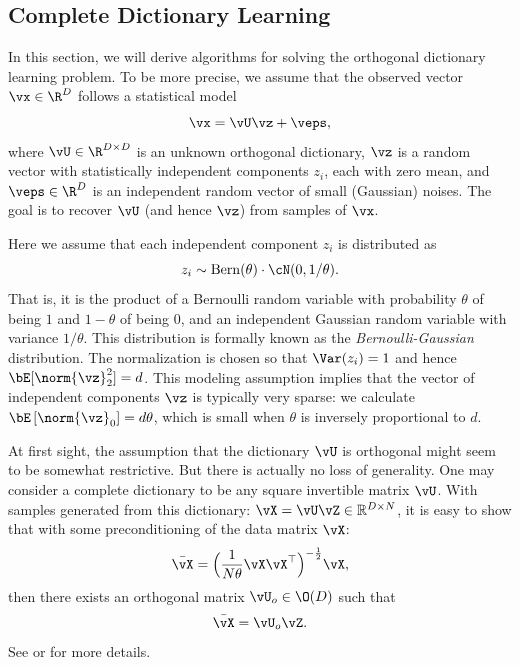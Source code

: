 \documentclass[../../book-main.tex]{subfiles}
\begin{document}
\subsection{Complete Dictionary Learning}
\label{sec:complete-dictionary}

In this section, we will derive algorithms for solving the orthogonal dictionary learning problem. To be more precise,  we assume that the observed vector $\vx \in \R^D$ follows a statistical model
\begin{equation}
    \vx = \vU \vz + \veps, 
    \label{eq:ica-model-ch2}
\end{equation}
where $\vU \in \R^{D \times D}$ is an unknown orthogonal dictionary, $\vz$ is a random vector with statistically independent components $z_i$, each with zero mean, and $\veps \in \R^D$ is an independent random vector of small (Gaussian) noises. The goal is to recover $\vU$ (and hence $\vz$) from samples of $\vx$.

Here we assume that each independent component $z_i$ is distributed as $$z_i \sim \mathrm{Bern}(\theta) \cdot \cN(0, 1/\theta).$$ That is, it is the product of a Bernoulli random variable with probability $\theta$ of being $1$ and $1-\theta$ of being $0$, and an independent Gaussian random variable with variance $1/\theta$. This distribution is formally known as the {\em Bernoulli-Gaussian} distribution. 
The normalization is chosen so that $\Var(z_i) = 1$ and hence $\bE[\norm{\vz}_2^2]=d$. 
This modeling assumption implies that the vector of independent components $\vz$ is typically very sparse: 
we calculate $\bE\left[\norm{\vz}_0\right] = d\theta$, which is small when $\theta$ is inversely proportional to $d$. 

\begin{remark} 
At first sight, the assumption that the dictionary $\vU$ is orthogonal might seem to be somewhat restrictive. But there is actually no loss of generality. One may consider a complete dictionary to be any square invertible matrix $\vU$. With samples generated from this dictionary: $\vX = \vU \vZ \in \mathbb{R}^{D\times N}$, it is easy to show that with some preconditioning of the data matrix $\vX$: 
\begin{equation}
    \bar{\vX} = \Big(\frac{1}{N\theta} \vX\vX^\top\Big)^{-\frac{1}{2}}\vX,
\end{equation}
then there exists an orthogonal matrix $\vU_{o} \in \O(D)$ such that
\begin{equation}
    \bar{\vX} = \vU_{o}\vZ.
\end{equation}
    See  or \cite{sun2017completeI} for more details.
\end{remark}
\end{document}
